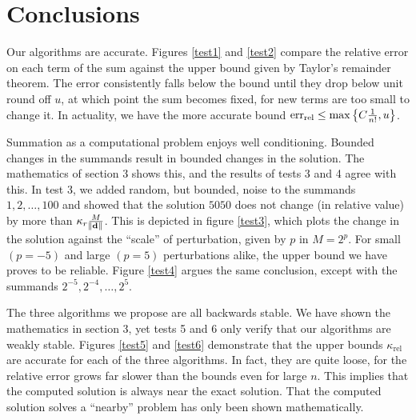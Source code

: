\documentclass[12pt]{article}
\theoremstyle{definition}
\begin{document}
\section{Conclusions}
Our algorithms are accurate. Figures \ref{test1} and \ref{test2} compare the relative error on each term of the sum against the upper bound given by Taylor's remainder theorem. The error consistently falls below the bound until they drop below unit round off $u$, at which point the sum becomes fixed, for new terms are too small to change it. In actuality, we have the more accurate bound $\mathrm{err}_{\text{rel}} \leq \max\cbr{C\frac{1}{n!},u}$.

Summation as a computational problem enjoys well conditioning. Bounded changes in the summands result in bounded changes in the solution. The mathematics of section 3 shows this, and the results of tests 3 and 4 agree with this. In test 3, we added random, but bounded, noise to the summands $1,2,\dots,100$ and showed that the solution $5050$ does not change (in relative value) by more than $\kappa_r \frac{M}{\norm{\mathbf{d}}}$. This is depicted in figure \ref{test3}, which plots the change in the solution against the ``scale'' of perturbation, given by $p$ in $M = 2^p$. For small $(p = -5)$ and large $(p = 5)$ perturbations alike, the upper bound we have proves to be reliable. Figure \ref{test4} argues the same conclusion, except with the summands $2^{-5},2^{-4},\dots,2^5$.

The three algorithms we propose are all backwards stable. We have shown the mathematics in section 3, yet tests 5 and 6 only verify that our algorithms are weakly stable. Figures \ref{test5} and \ref{test6} demonstrate that the upper bounds $\kappa_{\text{rel}}$ are accurate for each of the three algorithms. In fact, they are quite loose, for the relative error grows far slower than the bounds even for large $n$. This implies that the computed solution is always near the exact solution. That the computed solution solves a ``nearby'' problem has only been shown mathematically.
\end{document}
